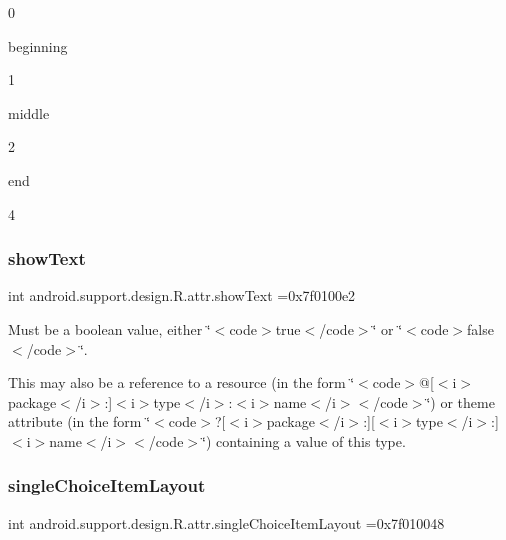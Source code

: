 0

{\ttfamily beginning}

1

{\ttfamily middle}

2

{\ttfamily end}

4\mbox{\label{classandroid_1_1support_1_1design_1_1R_1_1attr_a597e6085eb2b6ab2b0bf020cd0e1fb17}} 
\subsubsection{\texorpdfstring{show\+Text}{showText}}
{\footnotesize\ttfamily int android.\+support.\+design.\+R.\+attr.\+show\+Text =0x7f0100e2\hspace{0.3cm}{\ttfamily [static]}}

Must be a boolean value, either \char`\"{}$<$code$>$true$<$/code$>$\char`\"{} or \char`\"{}$<$code$>$false$<$/code$>$\char`\"{}. 

This may also be a reference to a resource (in the form \char`\"{}$<$code$>$@\mbox{[}$<$i$>$package$<$/i$>$\+:\mbox{]}$<$i$>$type$<$/i$>$\+:$<$i$>$name$<$/i$>$$<$/code$>$\char`\"{}) or theme attribute (in the form \char`\"{}$<$code$>$?\mbox{[}$<$i$>$package$<$/i$>$\+:\mbox{]}\mbox{[}$<$i$>$type$<$/i$>$\+:\mbox{]}$<$i$>$name$<$/i$>$$<$/code$>$\char`\"{}) containing a value of this type. \mbox{\label{classandroid_1_1support_1_1design_1_1R_1_1attr_a60f49df56d4291da99236ac0f3e4279c}} 
\subsubsection{\texorpdfstring{single\+Choice\+Item\+Layout}{singleChoiceItemLayout}}
{\footnotesize\ttfamily int android.\+support.\+design.\+R.\+attr.\+single\+Choice\+Item\+Layout =0x7f010048\hspace{0.3cm}{\ttfamily [static]}}

